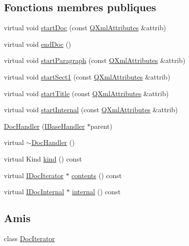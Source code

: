 \subsection*{Fonctions membres publiques}
\begin{DoxyCompactItemize}
\item 
virtual void \hyperlink{class_doc_handler_ad095922acf6d2612896e206d2fe7328c}{start\+Doc} (const \hyperlink{class_q_xml_attributes}{Q\+Xml\+Attributes} \&attrib)
\item 
virtual void \hyperlink{class_doc_handler_a2344eeac2cca9568c3d62c24f24a075c}{end\+Doc} ()
\item 
virtual void \hyperlink{class_doc_handler_a2da7af12ac55a2d510eb7fc106916b22}{start\+Paragraph} (const \hyperlink{class_q_xml_attributes}{Q\+Xml\+Attributes} \&attrib)
\item 
virtual void \hyperlink{class_doc_handler_a7ca413e08d821a5f2fbc1f6002e8297b}{start\+Sect1} (const \hyperlink{class_q_xml_attributes}{Q\+Xml\+Attributes} \&attrib)
\item 
virtual void \hyperlink{class_doc_handler_a8077e2ab801c76468ae056129c66585c}{start\+Title} (const \hyperlink{class_q_xml_attributes}{Q\+Xml\+Attributes} \&attrib)
\item 
virtual void \hyperlink{class_doc_handler_ace8c9543344eb6cf47a03b127c0e7049}{start\+Internal} (const \hyperlink{class_q_xml_attributes}{Q\+Xml\+Attributes} \&attrib)
\item 
\hyperlink{class_doc_handler_a0636ddbe69594ca581b5b22bb24c0166}{Doc\+Handler} (\hyperlink{class_i_base_handler}{I\+Base\+Handler} $\ast$parent)
\item 
virtual \hyperlink{class_doc_handler_affa93f20f44867a972e04576fa7f4a1c}{$\sim$\+Doc\+Handler} ()
\item 
virtual Kind \hyperlink{class_doc_handler_a90c7724715795c7465616b336e9d43b0}{kind} () const 
\item 
virtual \hyperlink{class_i_doc_iterator}{I\+Doc\+Iterator} $\ast$ \hyperlink{class_doc_handler_a7e10d2074fcb7cf89da8149565d829b9}{contents} () const 
\item 
virtual \hyperlink{class_i_doc_internal}{I\+Doc\+Internal} $\ast$ \hyperlink{class_doc_handler_a5b835258588fc64ade19436ab4517428}{internal} () const 
\end{DoxyCompactItemize}
\subsection*{Amis}
\begin{DoxyCompactItemize}
\item 
class \hyperlink{class_doc_handler_a531bd66459994eb17758adefa70d27dd}{Doc\+Iterator}
\end{DoxyCompactItemize}
